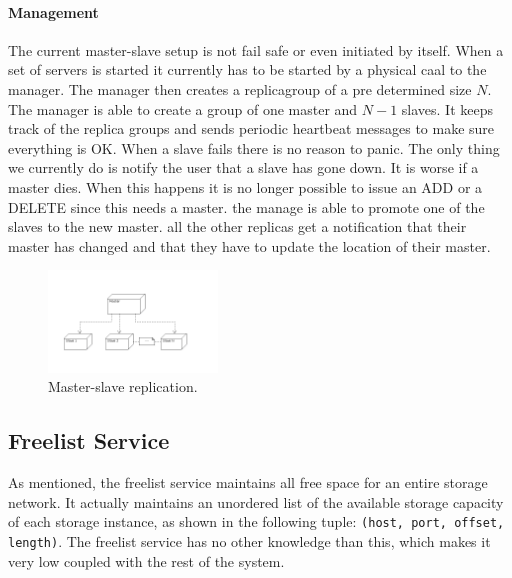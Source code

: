 \documentclass[12pt,a4paper]{scrartcl}
\begin{document}
\paragraph{Management}
\label{sec:management-dictionary}
The current master-slave setup is not fail safe or even initiated by itself. When a set of servers is started it currently has to be started by a physical caal to the manager. The manager then creates a replicagroup of a pre determined size $N$. The manager is able to create a group of one master and $N-1$ slaves. It keeps track of the replica groups and sends periodic heartbeat messages to make sure everything is OK. When a slave fails there is no reason to panic. The only thing we currently do is notify the user that a slave has gone down. It is worse if a master dies. When this happens it is no longer possible to issue an ADD or a DELETE since this needs a master. the manage is able to promote one of the slaves to the new master. all the other replicas get a notification that their master has changed and that they have to update the location of their master.

\begin{figure}[H]
\centering
\includegraphics[width=0.4\textwidth]{diagrams/MasterSlave.png} %
\caption{Master-slave replication.}
\label{fig:master-slave}
\end{figure}



\subsection{Freelist Service}
\label{sec:freelist}
As mentioned, the freelist service maintains all free space for an entire storage network. It actually maintains an unordered list of the available storage capacity of each storage instance, as shown in the following tuple: \verb|(host, port, offset, length)|. The freelist service has no other knowledge than this, which makes it very low coupled with the rest of the system.
\end{document}
